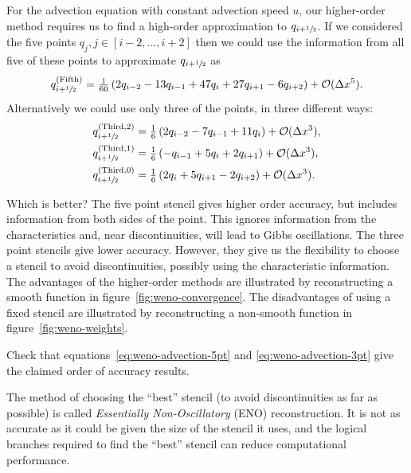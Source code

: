 For the advection equation with constant advection speed $u$, our higher-order
method requires us to find a high-order approximation to $q_{i+{\sfrac{1}{2}}}$. If we
considered the five points $q_{j}, j \in [i-2, \dots, i+2]$ then we could use
the information from all five of these points to approximate $q_{i+{\sfrac{1}{2}}}$ as
\begin{equation}
  \label{eq:weno-advection-5pt}
  q^{(\text{Fifth})}_{i+{\sfrac{1}{2}}} = \tfrac{1}{60} \left( 2 q_{i-2} - 13 q_{i-1} + 47 q_{i} + 27 q_{i+1} - 6 q_{i+2} \right) + {\cal O}(\Delta x^5).
\end{equation}
Alternatively we could use only three of the points, in three different ways:
\begin{subequations}
  \label{eq:weno-advection-3pt}
  \begin{align}
    q^{(\text{Third}, 2)}_{i+{\sfrac{1}{2}}} &= \tfrac{1}{6} \left( 2 q_{i-2} - 7 q_{i-1} + 11 q_{i} \right) + {\cal O}(\Delta x^3), \\
    q^{(\text{Third}, 1)}_{i+{\sfrac{1}{2}}} &= \tfrac{1}{6} \left( -q_{i-1} + 5 q_{i} + 2 q_{i+1} \right) + {\cal O}(\Delta x^3), \\
    q^{(\text{Third}, 0)}_{i+{\sfrac{1}{2}}} &= \tfrac{1}{6} \left( 2 q_{i} + 5 q_{i+1} - 2 q_{i+2} \right) + {\cal O}(\Delta x^3).
  \end{align}
\end{subequations}

Which is better? The five point stencil gives higher order accuracy, but
includes information from both sides of the point. This ignores information from
the characteristics and, near discontinuities, will lead to Gibbs oscillations.
The three point stencils give lower accuracy. However, they give us the
flexibility to choose a stencil to avoid discontinuities, possibly using the
characteristic information. The advantages of the higher-order methods are illustrated by reconstructing a smooth function in figure~\ref{fig:weno-convergence}. The disadvantages of using a fixed stencil are illustrated by reconstructing a non-smooth function in figure~\ref{fig:weno-weights}.


\begin{exercise}
{Check that equations~\eqref{eq:weno-advection-5pt} and
\eqref{eq:weno-advection-3pt} give the claimed order of accuracy results.}
\end{exercise}

The method of choosing the ``best'' stencil (to avoid discontinuities as far as
possible) is called \emph{Essentially Non-Oscillatory} (ENO) reconstruction. It
is not as accurate as it could be given the size of the stencil it uses, and
the logical branches required to find the ``best'' stencil can reduce
computational performance.

